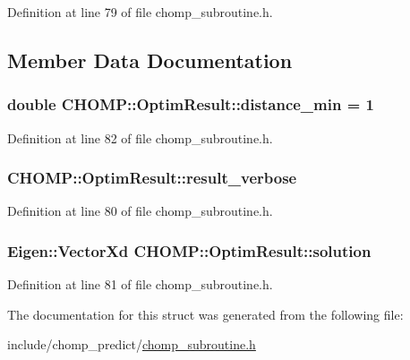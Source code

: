 Definition at line 79 of file chomp\+\_\+subroutine.\+h.



\subsection{Member Data Documentation}
\subsubsection[{\texorpdfstring{distance\+\_\+min}{distance_min}}]{\setlength{\rightskip}{0pt plus 5cm}double C\+H\+O\+M\+P\+::\+Optim\+Result\+::distance\+\_\+min = 1}\hypertarget{struct_c_h_o_m_p_1_1_optim_result_af32c849b25b8c323b3ae0a3f4236d881}{}\label{struct_c_h_o_m_p_1_1_optim_result_af32c849b25b8c323b3ae0a3f4236d881}


Definition at line 82 of file chomp\+\_\+subroutine.\+h.

\subsubsection[{\texorpdfstring{result\+\_\+verbose}{result_verbose}}]{ C\+H\+O\+M\+P\+::\+Optim\+Result\+::result\+\_\+verbose}\hypertarget{struct_c_h_o_m_p_1_1_optim_result_aa4314b8ae0ca38f9bad7fd8c7e1f9492}{}\label{struct_c_h_o_m_p_1_1_optim_result_aa4314b8ae0ca38f9bad7fd8c7e1f9492}


Definition at line 80 of file chomp\+\_\+subroutine.\+h.

\subsubsection[{\texorpdfstring{solution}{solution}}]{\setlength{\rightskip}{0pt plus 5cm}Eigen\+::\+Vector\+Xd C\+H\+O\+M\+P\+::\+Optim\+Result\+::solution}\hypertarget{struct_c_h_o_m_p_1_1_optim_result_ae85f14f34c231bb2f5767553b6771f9c}{}\label{struct_c_h_o_m_p_1_1_optim_result_ae85f14f34c231bb2f5767553b6771f9c}


Definition at line 81 of file chomp\+\_\+subroutine.\+h.



The documentation for this struct was generated from the following file\+:\begin{DoxyCompactItemize}
\item 
include/chomp\+\_\+predict/\hyperlink{chomp__subroutine_8h}{chomp\+\_\+subroutine.\+h}\end{DoxyCompactItemize}
